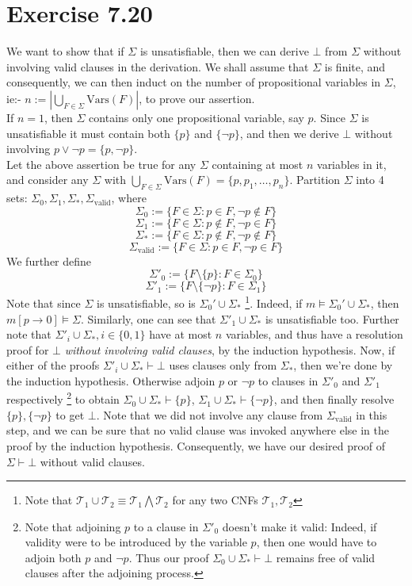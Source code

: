 \documentclass{article}
\newcommand{\Vars}{\mathrm{Vars}}
\begin{document}
\section*{Exercise 7.20}
We want to show that if $\Sigma$ is unsatisfiable, then we can derive $\bot$ from $\Sigma$ without involving valid clauses in the derivation. We shall assume that $\Sigma$ is finite, and consequently, we can then induct on the number of propositional variables in $\Sigma$, ie:- $n:= \left|\bigcup_{F\in\Sigma}\Vars(F)\right|$, to prove our assertion.\\
If $n = 1$, then $\Sigma$ contains only one propositional variable, say $p$. Since $\Sigma$ is unsatisfiable it must contain both $\{p\}$ and $\{\lnot p\}$, and then we derive $\bot$ without involving $p\lor\lnot p = \{p, \lnot p\}$.\\
Let the above assertion be true for any $\Sigma$ containing at most $n$ variables in it, and consider any $\Sigma$ with $\bigcup_{F\in\Sigma}\Vars(F) = \{p, p_1, \ldots, p_n\}$. Partition $\Sigma$ into 4 sets: $\Sigma_0, \Sigma_1, \Sigma_*, \Sigma_{\mathrm{valid}}$, where 
$$\Sigma_0:= \{F\in\Sigma: p\in F, \lnot p\not\in F\}$$
$$\Sigma_1:= \{F\in\Sigma: p\not\in F, \lnot p\in F\}$$
$$\Sigma_*:= \{F\in\Sigma: p\not\in F, \lnot p\not\in F\}$$
$$\Sigma_{\mathrm{valid}} := \{F\in\Sigma: p\in F, \lnot p\in F\}$$
We further define
$$\Sigma'_0 := \{F\setminus\{p\}: F\in\Sigma_0\}$$
$$\Sigma'_1 := \{F\setminus\{\lnot p\}: F\in\Sigma_1\}$$
Note that since $\Sigma$ is unsatisfiable, so is $\Sigma_0'\cup\Sigma_*$ \footnote{Note that $\mathcal{T}_1\cup\mathcal{T}_2 \equiv \mathcal{T}_1\bigwedge\mathcal{T}_2$ for any two CNFs $\mathcal{T}_1, \mathcal{T}_2$}. Indeed, if $m\models\Sigma_0'\cup\Sigma_*$, then $m[p\rightarrow 0]\models\Sigma$. Similarly, one can see that $\Sigma'_1\cup\Sigma_*$ is unsatisfiable too. Further note that $\Sigma'_i\cup\Sigma_*, i\in\{0, 1\}$ have at most $n$ variables, and thus have a resolution proof for $\bot$ \emph{without involving valid clauses}, by the induction hypothesis. Now, if either of the proofs $\Sigma'_i\cup\Sigma_*\vdash\bot$ uses clauses only from $\Sigma_*$, then we're done by the induction hypothesis. Otherwise adjoin $p$ or $\lnot p$ to clauses in $\Sigma'_0$ and $\Sigma'_1$ respectively \footnote{Note that adjoining $p$ to a clause in $\Sigma'_0$ doesn't make it valid: Indeed, if validity were to be introduced by the variable $p$, then one would have to adjoin both $p$ and $\lnot p$. Thus our proof $\Sigma_0\cup\Sigma_*\vdash\bot$ remains free of valid clauses after the adjoining process.} to obtain $\Sigma_0\cup\Sigma_*\vdash\{p\}$, $\Sigma_1\cup\Sigma_*\vdash\{\lnot p\}$, and then finally resolve $\{p\}, \{\lnot p\}$ to get $\bot$. Note that we did not involve any clause from $\Sigma_{\mathrm{valid}}$ in this step, and we can be sure that no valid clause was invoked anywhere else in the proof by the induction hypothesis. Consequently, we have our desired proof of $\Sigma\vdash\bot$ without valid clauses.
\end{document}

